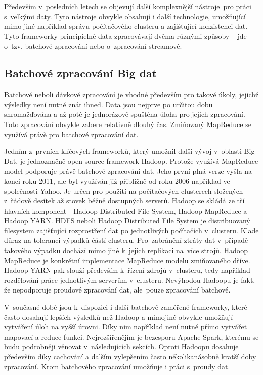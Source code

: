 \documentclass[thesis=B,czech]{FITthesis}[2012/06/26]
\begin{document}
	Především v~posledních letech se objevují další komplexnější nástroje~pro práci s~velkými daty. Tyto nástroje obvykle obsahují i další technologie, umožňující mimo jiné například správu počítačového clusteru a zajišťující konzistenci dat. Tyto frameworky principielně data zpracovávají dvěma různými způsoby -- jde o~tzv. batchové zpracování nebo o~zpracování streamové. 
	
\subsection{Batchové zpracování Big dat}
	Batchové neboli dávkové zpracování je vhodné především pro takové úkoly, jejichž výsledky není nutné znát ihned. Data jsou nejprve po určitou dobu shromažďována a až poté je jednorázově spuštěna úloha pro jejich zpracování. Toto zpracování obvykle zabere relativně dlouhý čas. Zmiňovaný MapReduce se využívá právě pro batchové zpracování dat. 

	Jedním z~prvních klíčových frameworků, který umožnil další vývoj v~oblasti Big Dat, je jednoznačně open-source framework Hadoop\cite{hadoop-home}. Protože využívá MapReduce model podporuje právě batchové zpracování dat. Jeho první plná verze vyšla na konci roku 2011, ale byl využíván již přibližně od roku 2006 například ve společnosti Yahoo\cite{hadoop-history}. Je určen pro použití na počítačových clusterech složených z~řádově desítek až stovek běžně dostupných serverů. Hadoop se skládá ze tří hlavních komponent - Hadoop Distributed File System, Hadoop MapReduce a Hadoop YARN. HDFS neboli Hadoop Distributed File System je distribuovaný filesystem zajišťující rozprostření dat po jednotlivých počítačích v~clusteru. Klade důraz na toleranci výpadků částí clusteru. Pro~zabránění ztráty dat v~případě takového výpadku dochází mimo jiné k~jejich replikaci na~více strojů. Hadoop MapReduce je konkrétní implementace Map\-Reduce modelu zmiňovaného dříve. Hadoop YARN pak slouží především k~řízení zdrojů v~clusteru, tedy například rozdělování práce jednotlivým serverům v~clusteru. Nevýhodou Hadoopu je fakt, že nepodporuje proudové zpracování dat, ale~pouze zpracování batchové. 
	
	V~současné době jsou k~dispozici i další batchově zaměřené frameworky, které často dosahují lepších výsledků než Hadoop a mimojiné obvykle umožňují vytváření úloh na vyšší úrovni. Díky nim například není nutné přímo vytvářet mapovací a reduce funkci. Nejrozšířenějím je bezesporu Apache Spark\cite{spark-home}, kterému se budu podrobněji věnovat v~následujících sekcích. Oproti \mbox{Hadoopu} dosahuje především díky cachování a dalším vylepšením často několikanásobně kratší doby zpracování. Krom batchového zpracování umožňuje i práci s~proudy dat. 
\end{document}
